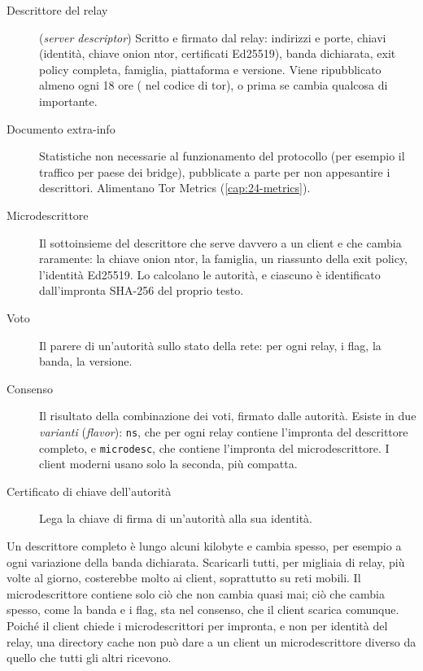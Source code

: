 \begin{description}
  \item[Descrittore del relay] (\emph{server descriptor}) Scritto e firmato dal relay: indirizzi e porte, chiavi (identità, chiave onion ntor, certificati Ed25519), banda dichiarata, exit policy completa, famiglia, piattaforma e versione. Viene ripubblicato almeno ogni 18 ore ( nel codice di tor), o prima se cambia qualcosa di importante.
  \item[Documento extra-info] Statistiche non necessarie al funzionamento del protocollo (per esempio il traffico per paese dei bridge), pubblicate a parte per non appesantire i descrittori. Alimentano Tor Metrics (\cref{cap:24-metrics}).
  \item[Microdescrittore] Il sottoinsieme del descrittore che serve davvero a un client e che cambia raramente: la chiave onion ntor, la famiglia, un riassunto della exit policy, l'identità Ed25519. Lo calcolano le autorità, e ciascuno è identificato dall'impronta SHA-256 del proprio testo.
  \item[Voto] Il parere di un'autorità sullo stato della rete: per ogni relay, i flag, la banda, la versione.
  \item[Consenso] Il risultato della combinazione dei voti, firmato dalle autorità. Esiste in due \emph{varianti} (\emph{flavor}): \texttt{ns}, che per ogni relay contiene l'impronta del descrittore completo, e \texttt{microdesc}, che contiene l'impronta del microdescrittore. I client moderni usano solo la seconda, più compatta.
  \item[Certificato di chiave dell'autorità] Lega la chiave di firma di un'autorità alla sua identità.
\end{description}

\begin{approfondimento}
Un descrittore completo è lungo alcuni kilobyte e cambia spesso, per esempio a ogni variazione della banda dichiarata. Scaricarli tutti, per migliaia di relay, più volte al giorno, costerebbe molto ai client, soprattutto su reti mobili. Il microdescrittore contiene solo ciò che non cambia quasi mai; ciò che cambia spesso, come la banda e i flag, sta nel consenso, che il client scarica comunque. Poiché il client chiede i microdescrittori per impronta, e non per identità del relay, una directory cache non può dare a un client un microdescrittore diverso da quello che tutti gli altri ricevono.
\end{approfondimento}

